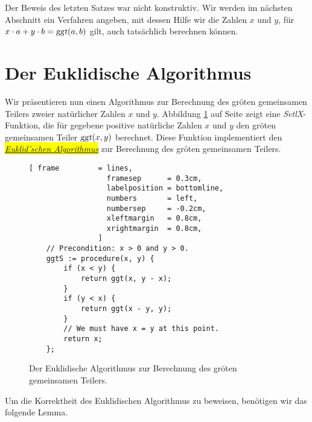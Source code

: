 \remark
Der Beweis des letzten Satzes war nicht konstruktiv.  Wir werden im n\"{a}chsten Abschnitt ein
Verfahren angeben, mit dessen Hilfe wir die Zahlen $x$ und $y$, f\"{u}r 
$x \cdot a + y \cdot b = \textsl{ggt}(a, b)$ gilt, auch tats\"{a}chlich berechnen k\"{o}nnen.


\section{Der Euklidische Algorithmus}
Wir pr\"{a}sentieren nun einen Algorithmus zur Berechnung des gr\"{o}\3ten gemeinsamen 
Teilers zweier nat\"{u}rlicher Zahlen $x$ und $y$.
 Abbildung \ref{fig:ggt.stlx} auf Seite \pageref{fig:ggt.stlx} zeigt eine
\textsl{SetlX}-Funktion, die f\"{u}r gegebene positive nat\"{u}rliche Zahlen $x$ und $y$ den gr\"{o}\3ten gemeinsamen  Teiler 
$\textsl{ggt}(x,y)$ berechnet.  Diese Funktion implementiert den 
\colorbox{yellow}{\href{https://en.wikipedia.org/wiki/Euclidean_algorithm}{\emph{Euklid'schen Algorithmus}}} zur
Berechnung des gr\"{o}\3ten gemeinsamen Teilers. 


\begin{figure}[!ht]
\centering
\begin{Verbatim}[ frame         = lines, 
                  framesep      = 0.3cm, 
                  labelposition = bottomline,
                  numbers       = left,
                  numbersep     = -0.2cm,
                  xleftmargin   = 0.8cm,
                  xrightmargin  = 0.8cm,
                ]
    // Precondition: x > 0 and y > 0.
    ggtS := procedure(x, y) {
        if (x < y) {
            return ggt(x, y - x);
        }
        if (y < x) {
            return ggt(x - y, y); 
        }
        // We must have x = y at this point.
        return x;
    };
\end{Verbatim}
\vspace*{-0.3cm}
\caption{Der Euklidische Algorithmus zur Berechnung des gr\"{o}\3ten gemeinsamen Teilers.}
\label{fig:ggt.stlx}
\end{figure}

Um die Korrektheit des Euklidischen Algorithmus zu beweisen, ben\"{o}tigen wir das folgende Lemma.

